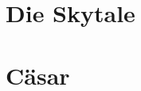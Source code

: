 \documentclass{../crypto}
\begin{document}
\section{Die Skytale}

\subsection{}

\subsection{}

\subsection{}


\section{Cäsar\protect\raisebox{1ex}{\normalfont\tiny 2}}

\subsection{}

\subsection{}
\end{document}

